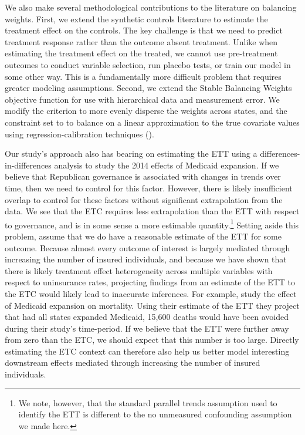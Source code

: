 \documentclass[12pt]{article}
\begin{document}
We also make several methodological contributions to the literature on balancing weights. First, we extend the synthetic controls literature to estimate the treatment effect on the controls. The key challenge is that we need to predict treatment response rather than the outcome absent treatment. Unlike when estimating the treatment effect on the treated, we cannot use pre-treatment outcomes to conduct variable selection, run placebo tests, or train our model in some other way. This is a fundamentally more difficult problem that requires greater modeling assumptions. Second, we extend the Stable Balancing Weights objective function for use with hierarchical data and measurement error. We modify the criterion to more evenly disperse the weights across states, and the constraint set to to balance on a linear approximation to the true covariate values using regression-calibration techniques (\cite{gleser1992importance}).

Our study's approach also has bearing on estimating the ETT using a differences-in-differences analysis to study the 2014 effects of Medicaid expansion. If we believe that Republican governance is associated with changes in trends over time, then we need to control for this factor. However, there is likely insufficient overlap to control for these factors without significant extrapolation from the data. We see that the ETC requires less extrapolation than the ETT with respect to governance, and is in some sense a more estimable quantity.\footnote{We note, however, that the standard parallel trends assumption used to identify the ETT is different to the no unmeasured confounding assumption we made here.} Setting aside this problem, assume that we do have a reasonable estimate of the ETT for some outcome. Because almost every outcome of interest is largely mediated through increasing the number of insured individuals, and because we have shown that there is likely treatment effect heterogeneity across multiple variables with respect to uninsurance rates, projecting findings from an estimate of the ETT to the ETC would likely lead to inaccurate inferences. For example, \cite{miller2019medicaid} study the effect of Medicaid expansion on mortality. Using their estimate of the ETT they project that had all states expanded Medicaid, 15,600 deaths would have been avoided during their study's time-period. If we believe that the ETT were further away from zero than the ETC, we should expect that this number is too large. Directly estimating the ETC context can therefore also help us better model interesting downstream effects mediated through increasing the number of insured individuals. 
\end{document}
